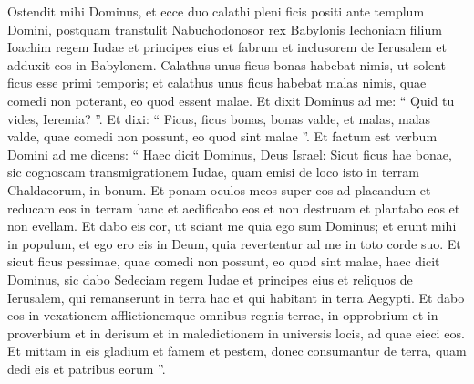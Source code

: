 \begin{biblechapter}
\begin{biblechapter}
\begin{biblechapter}
\begin{biblechapter}
\begin{biblechapter}
\begin{biblechapter}
\begin{biblechapter}
\begin{biblechapter}
\begin{biblechapter}
\begin{biblechapter}
\begin{biblechapter}
\begin{biblechapter}
\begin{biblechapter}
\begin{biblechapter}
\begin{biblechapter}
\begin{biblechapter}
\begin{biblechapter}
\begin{biblechapter}
\begin{biblechapter}
\begin{biblechapter}
\begin{biblechapter}
\begin{biblechapter}
\begin{biblechapter}
\begin{biblechapter}
\verse Ostendit mihi Dominus, et ecce duo calathi pleni ficis positi ante templum Domini, postquam transtulit Nabuchodonosor rex Babylonis Iechoniam filium Ioachim regem Iudae et principes eius et fabrum et inclusorem de Ierusalem et adduxit eos in Babylonem. 
\verse Calathus unus ficus bonas habebat nimis, ut solent ficus esse primi temporis; et calathus unus ficus habebat malas nimis, quae comedi non poterant, eo quod essent malae.
 \verse Et dixit Dominus ad me: “ Quid tu vides, Ieremia? ”. Et dixi: “ Ficus, ficus bonas, bonas valde, et malas, malas valde, quae comedi non possunt, eo quod sint malae ”. 
\verse Et factum est verbum Domini ad me dicens: 
\verse “ Haec dicit Dominus, Deus Israel: Sicut ficus hae bonae, sic cognoscam transmigrationem Iudae, quam emisi de loco isto in terram Chaldaeorum, in bonum. 
\verse Et ponam oculos meos super eos ad placandum et reducam eos in terram hanc et aedificabo eos et non destruam et plantabo eos et non evellam. 
\verse Et dabo eis cor, ut sciant me quia ego sum Dominus; et erunt mihi in populum, et ego ero eis in Deum, quia revertentur ad me in toto corde suo.
 \verse Et sicut ficus pessimae, quae comedi non possunt, eo quod sint malae, haec dicit Dominus, sic dabo Sedeciam regem Iudae et principes eius et reliquos de Ierusalem, qui remanserunt in terra hac et qui habitant in terra Aegypti. 
\verse Et dabo eos in vexationem afflictionemque omnibus regnis terrae, in opprobrium et in proverbium et in derisum et in maledictionem in universis locis, ad quae eieci eos. 
\verse Et mittam in eis gladium et famem et pestem, donec consumantur de terra, quam dedi eis et patribus eorum ”.
 

\end{biblechapter}
\end{biblechapter}
\end{biblechapter}
\end{biblechapter}
\end{biblechapter}
\end{biblechapter}
\end{biblechapter}
\end{biblechapter}
\end{biblechapter}
\end{biblechapter}
\end{biblechapter}
\end{biblechapter}
\end{biblechapter}
\end{biblechapter}
\end{biblechapter}
\end{biblechapter}
\end{biblechapter}
\end{biblechapter}
\end{biblechapter}
\end{biblechapter}
\end{biblechapter}
\end{biblechapter}
\end{biblechapter}
\end{biblechapter}
